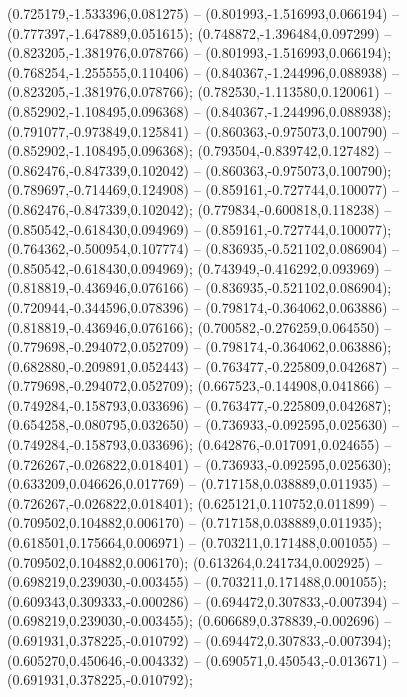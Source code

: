  (0.725179,-1.533396,0.081275) -- (0.801993,-1.516993,0.066194) -- (0.777397,-1.647889,0.051615);
 (0.748872,-1.396484,0.097299) -- (0.823205,-1.381976,0.078766) -- (0.801993,-1.516993,0.066194);
 (0.768254,-1.255555,0.110406) -- (0.840367,-1.244996,0.088938) -- (0.823205,-1.381976,0.078766);
 (0.782530,-1.113580,0.120061) -- (0.852902,-1.108495,0.096368) -- (0.840367,-1.244996,0.088938);
 (0.791077,-0.973849,0.125841) -- (0.860363,-0.975073,0.100790) -- (0.852902,-1.108495,0.096368);
 (0.793504,-0.839742,0.127482) -- (0.862476,-0.847339,0.102042) -- (0.860363,-0.975073,0.100790);
 (0.789697,-0.714469,0.124908) -- (0.859161,-0.727744,0.100077) -- (0.862476,-0.847339,0.102042);
 (0.779834,-0.600818,0.118238) -- (0.850542,-0.618430,0.094969) -- (0.859161,-0.727744,0.100077);
 (0.764362,-0.500954,0.107774) -- (0.836935,-0.521102,0.086904) -- (0.850542,-0.618430,0.094969);
 (0.743949,-0.416292,0.093969) -- (0.818819,-0.436946,0.076166) -- (0.836935,-0.521102,0.086904);
 (0.720944,-0.344596,0.078396) -- (0.798174,-0.364062,0.063886) -- (0.818819,-0.436946,0.076166);
 (0.700582,-0.276259,0.064550) -- (0.779698,-0.294072,0.052709) -- (0.798174,-0.364062,0.063886);
 (0.682880,-0.209891,0.052443) -- (0.763477,-0.225809,0.042687) -- (0.779698,-0.294072,0.052709);
 (0.667523,-0.144908,0.041866) -- (0.749284,-0.158793,0.033696) -- (0.763477,-0.225809,0.042687);
 (0.654258,-0.080795,0.032650) -- (0.736933,-0.092595,0.025630) -- (0.749284,-0.158793,0.033696);
 (0.642876,-0.017091,0.024655) -- (0.726267,-0.026822,0.018401) -- (0.736933,-0.092595,0.025630);
 (0.633209,0.046626,0.017769) -- (0.717158,0.038889,0.011935) -- (0.726267,-0.026822,0.018401);
 (0.625121,0.110752,0.011899) -- (0.709502,0.104882,0.006170) -- (0.717158,0.038889,0.011935);
 (0.618501,0.175664,0.006971) -- (0.703211,0.171488,0.001055) -- (0.709502,0.104882,0.006170);
 (0.613264,0.241734,0.002925) -- (0.698219,0.239030,-0.003455) -- (0.703211,0.171488,0.001055);
 (0.609343,0.309333,-0.000286) -- (0.694472,0.307833,-0.007394) -- (0.698219,0.239030,-0.003455);
 (0.606689,0.378839,-0.002696) -- (0.691931,0.378225,-0.010792) -- (0.694472,0.307833,-0.007394);
 (0.605270,0.450646,-0.004332) -- (0.690571,0.450543,-0.013671) -- (0.691931,0.378225,-0.010792);
